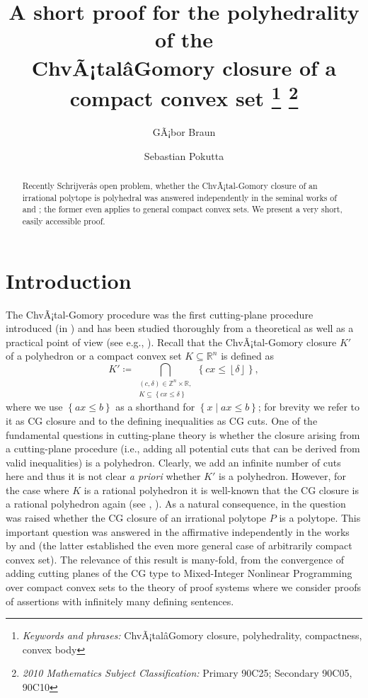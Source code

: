 \documentclass[11pt]{article}
\title{A short proof for the polyhedrality of the \\
  ChvÃ¡talâGomory closure of a compact convex set  \thanks{\emph{Keywords and phrases:}
    ChvÃ¡talâGomory closure, polyhedrality, compactness,
    convex body} 
  \thanks{\emph{2010 Mathematics Subject Classification:}
    Primary 90C25; Secondary 90C05, 90C10}}
\date{}
\author{GÃ¡bor Braun}
\author{Sebastian Pokutta}
\affil{ISyE,
  Georgia Institute of Technology,
  Atlanta, GA 30332, USA.
  \textit{Email:}~\{gabor.braun,~sebastian.pokutta\}@isye.gatech.edu}
\theoremstyle{remark}
\begin{document}
\maketitle

\begin{abstract}
Recently Schrijverâs open problem, whether the ChvÃ¡tal-Gomory closure of an
irrational polytope is polyhedral was answered independently in the
seminal works of \cite{DDV2011} and \cite{ds2010}; the former even
applies to general compact convex sets. We present a very short, easily
accessible proof.
\end{abstract}

\section{Introduction}
\label{sec:introduction}
The ChvÃ¡tal-Gomory procedure was the first cutting-plane procedure
introduced (in \cite{GY1,GY2,GY3,Chvatal}) and has been studied thoroughly from a
theoretical as well as a practical point of view (see e.g., \cite{CCH,CF1,BEHS,letchford2002strengthening,ES,fischetti2007optimizing,C,bonami2008projected}). 
Recall that the ChvÃ¡tal-Gomory closure \(K'\) of a polyhedron or
a compact convex set \(K \subseteq {\mathbb{R}}^n\) is defined as
\[K' \coloneqq \bigcap_{\substack{(c,\delta) \in {\mathbb{Z}}^{n} \times {\mathbb{R}}, \\
K \subseteq {\left\{{cx \leq \delta}\right\}}}} {\left\{{cx \leq
{\left\lfloor{\delta}\right\rfloor}}\right\}},\]
where we use \({\left\{{ax \leq b}\right\}}\) as a shorthand for \({\left\{{x
  \mid ax \leq b}\right\}}\); for brevity we refer to it as {CG\xspace} closure and
to the defining inequalities as {CG\xspace} cuts.
One of the fundamental
questions in cutting-plane theory is whether the closure arising from a
cutting-plane procedure (i.e., adding all potential cuts that can be
derived from valid inequalities) is a polyhedron. Clearly, we
add an infinite number of cuts here and thus it is not clear \emph{a
  priori} whether \(K'\) is a polyhedron. However, for the case where
\(K\) is a rational polyhedron it is well-known that the {CG\xspace} closure is a rational
polyhedron again  (see \cite{schr1980},
\cite{Chvatal}). As a natural consequence, in \cite{schr1980} the question was raised
whether the {CG\xspace} closure of an irrational
polytope \(P\) is a polytope. This important question was answered
in the affirmative independently in the works by 
\cite{ds2010} and \cite{DDV2011} (the latter established the even more
general case of arbitrarily compact convex
set). The relevance of this result is many-fold, from the convergence
of adding cutting planes of the {CG\xspace} type to Mixed-Integer Nonlinear Programming over compact convex
sets to the theory of proof systems where we consider proofs of
assertions with infinitely many defining sentences.
\end{document}
